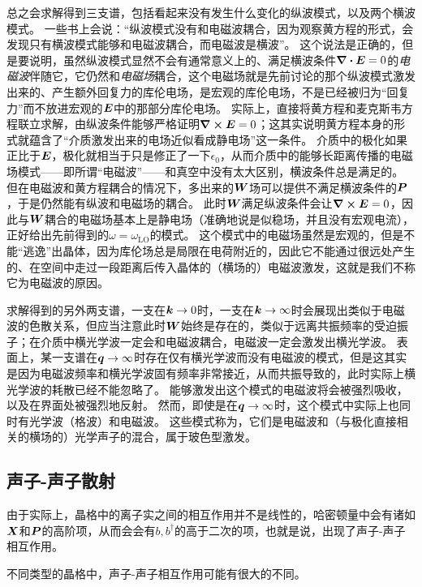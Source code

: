 总之会求解得到三支谱，包括看起来没有发生什么变化的纵波模式，以及两个横波模式。
一些书上会说：“纵波模式没有和电磁波耦合，因为观察黄方程的形式，会发现只有横波模式能够和电磁波耦合，而电磁波是横波”。
这个说法是正确的，但是要说明，虽然纵波模式显然不会有通常意义上的、满足横波条件$\div{\vb*{E}}=0$的\emph{电磁波}伴随它，它仍然和\emph{电磁场}耦合，这个电磁场就是先前讨论的那个纵波模式激发出来的、产生额外回复力的库伦电场，是宏观的库伦电场，不是已经被归为“回复力”而不放进宏观的$\vb*{E}$中的那部分库伦电场。
实际上，直接将黄方程和麦克斯韦方程联立求解，由纵波条件能够严格证明$\curl{\vb*{E}}=0$；这其实说明黄方程本身的形式就蕴含了“介质激发出来的电场近似看成静电场”这一条件。
介质中的极化如果正比于$\vb*{E}$，极化就相当于只是修正了一下$\epsilon_0$，从而介质中的能够长距离传播的电磁场模式——即所谓“电磁波”——和真空中没有太大区别，横波条件总是满足的。
但在电磁波和黄方程耦合的情况下，多出来的$\vb*{W}$场可以提供不满足横波条件的$\vb*{P}$，于是仍然能有纵波和电磁场的耦合。
此时$\vb*{W}$满足纵波条件会让$\curl{\vb*{E}}=0$，因此与$\vb*{W}$耦合的电磁场基本上是静电场（准确地说是似稳场，并且没有宏观电流），正好给出先前得到的$\omega=\omega_\text{LO}$的模式。
这个模式中的电磁场虽然是宏观的，但是不能“逃逸”出晶体，因为库伦场总是局限在电荷附近的，因此它不能通过很远处产生的、在空间中走过一段距离后传入晶体的（横场的）电磁波激发，这就是我们不称它为电磁波的原因。

求解得到的另外两支谱，一支在$\vb*{k} \to 0$时，一支在$\vb*{k} \to \infty$时会展现出类似于电磁波的色散关系，但应当注意此时$\vb*{W}$始终是存在的，类似于远离共振频率的受迫振子；在介质中横光学波一定会和电磁波耦合，电磁波一定会激发出横光学波。
表面上，某一支谱在$\vb*{q} \to \infty$时存在仅有横光学波而没有电磁波的模式，但是这其实是因为电磁波频率和横光学波固有频率非常接近，从而共振导致的，此时实际上横光学波的耗散已经不能忽略了。
能够激发出这个模式的电磁波将会被强烈吸收，以及在界面处被强烈地反射。
然而，即使是在$\vb*{q} \to \infty$时，这个模式中实际上也同时有光学波（格波）和电磁波。
这些模式称为，它们是电磁波和（与极化直接相关的横场的）光学声子的混合，属于玻色型激发。

\subsection{声子-声子散射}

由于实际上，晶格中的离子实之间的相互作用并不是线性的，哈密顿量中会有诸如$\vb*{X}$和$\vb*{P}$的高阶项，从而会会有${b}, {b}^\dagger$的高于二次的项，也就是说，出现了声子-声子相互作用。

不同类型的晶格中，声子-声子相互作用可能有很大的不同。

